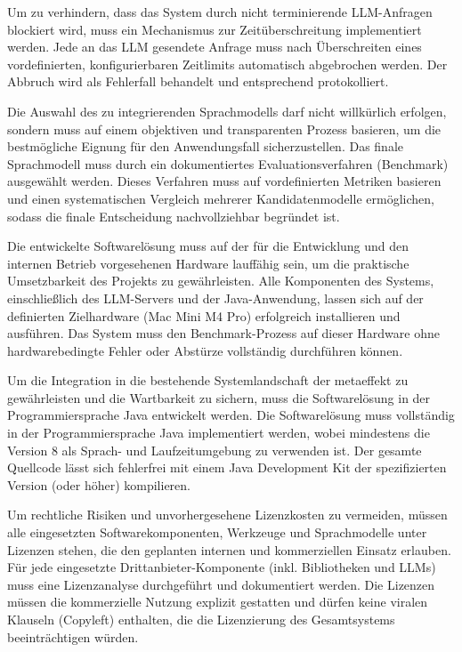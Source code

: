 \begin{anforderungsliste}
        {Um zu verhindern, dass das System durch nicht terminierende LLM-Anfragen blockiert wird, muss ein Mechanismus zur Zeitüberschreitung implementiert werden.}
        {Jede an das LLM gesendete Anfrage muss nach Überschreiten eines vordefinierten, konfigurierbaren Zeitlimits automatisch abgebrochen werden. Der Abbruch wird als Fehlerfall behandelt und entsprechend protokolliert.}

        {Die Auswahl des zu integrierenden Sprachmodells darf nicht willkürlich erfolgen, sondern muss auf einem objektiven und transparenten Prozess basieren, um die bestmögliche Eignung für den Anwendungsfall sicherzustellen.}
        {Das finale Sprachmodell muss durch ein dokumentiertes Evaluationsverfahren (Benchmark) ausgewählt werden. Dieses Verfahren muss auf vordefinierten Metriken basieren und einen systematischen Vergleich mehrerer Kandidatenmodelle ermöglichen, sodass die finale Entscheidung nachvollziehbar begründet ist.}

        {Die entwickelte Softwarelösung muss auf der für die Entwicklung und den internen Betrieb vorgesehenen Hardware lauffähig sein, um die praktische Umsetzbarkeit des Projekts zu gewährleisten.}
        {Alle Komponenten des Systems, einschließlich des LLM-Servers und der Java-Anwendung, lassen sich auf der definierten Zielhardware (Mac Mini M4 Pro) erfolgreich installieren und ausführen. Das System muss den Benchmark-Prozess auf dieser Hardware ohne hardwarebedingte Fehler oder Abstürze vollständig durchführen können.}

        {Um die Integration in die bestehende Systemlandschaft der metaeffekt zu gewährleisten und die Wartbarkeit zu sichern, muss die Softwarelösung in der Programmiersprache Java entwickelt werden.}
        {Die Softwarelösung muss vollständig in der Programmiersprache Java implementiert werden, wobei mindestens die Version 8 als Sprach- und Laufzeitumgebung zu verwenden ist. Der gesamte Quellcode lässt sich fehlerfrei mit einem Java Development Kit der spezifizierten Version (oder höher) kompilieren.}

        {Um rechtliche Risiken und unvorhergesehene Lizenzkosten zu vermeiden, müssen alle eingesetzten Softwarekomponenten, Werkzeuge und Sprachmodelle unter Lizenzen stehen, die den geplanten internen und kommerziellen Einsatz erlauben.}
        {Für jede eingesetzte Drittanbieter-Komponente (inkl. Bibliotheken und LLMs) muss eine Lizenzanalyse durchgeführt und dokumentiert werden. Die Lizenzen müssen die kommerzielle Nutzung explizit gestatten und dürfen keine viralen Klauseln (Copyleft) enthalten, die die Lizenzierung des Gesamtsystems beeinträchtigen würden.}


\end{anforderungsliste}
